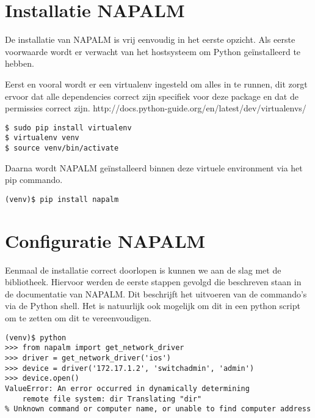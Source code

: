 \section{Installatie NAPALM}
\label{ch:napalminstallation}
De installatie van NAPALM is vrij eenvoudig in het eerste opzicht. Als eerste voorwaarde wordt er verwacht van het hostsysteem om Python geïnstalleerd te hebben. 

Eerst en vooral wordt er een virtualenv ingesteld om alles in te runnen, dit zorgt ervoor dat alle dependencies correct zijn specifiek voor deze package en dat de permissies correct zijn. http://docs.python-guide.org/en/latest/dev/virtualenvs/

\begin{center}
\begin{BVerbatim}
$ sudo pip install virtualenv
$ virtualenv venv
$ source venv/bin/activate
\end{BVerbatim}
\end{center}

Daarna wordt NAPALM geïnstalleerd binnen deze virtuele environment via het pip commando.
\begin{center}
\begin{BVerbatim}
(venv)$ pip install napalm
\end{BVerbatim}
\end{center}

\section{Configuratie NAPALM}
\label{ch:napalmconfiguration}

Eenmaal de installatie correct doorlopen is kunnen we aan de slag met de bibliotheek. Hiervoor werden de eerste stappen gevolgd die beschreven staan in de documentatie van NAPALM. Dit beschrijft het uitvoeren van de commando's via de Python shell. Het is natuurlijk ook mogelijk om dit in een python script om te zetten om dit te vereenvoudigen. 

\begin{center}
\begin{BVerbatim}
(venv)$ python
>>> from napalm import get_network_driver
>>> driver = get_network_driver('ios')
>>> device = driver('172.17.1.2', 'switchadmin', 'admin')
>>> device.open()
ValueError: An error occurred in dynamically determining
    remote file system: dir Translating "dir"
\end{BVerbatim}
\end{center}

